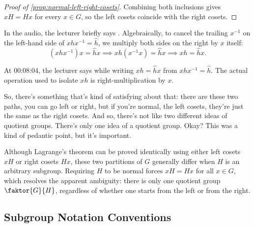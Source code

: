\begin{proofWrapper}
\begin{content}
\begin{proof}[Proof of \cref{prop:normal-left-right-cosets}]
Combining both inclusions gives $xH = Hx$ for every $x \in G$, so the left cosets coincide with the right cosets.
\end{proof}

\begin{steps}
In the audio, the lecturer briefly says . Algebraically, to cancel the trailing $x^{-1}$ on the left-hand side of $x h x^{-1} = \hat{h}$, we multiply both sides on the right by $x$ itself:
\[
(x h x^{-1}) x = \hat{h} x \implies x h (x^{-1} x) = \hat{h} x \implies x h = \hat{h} x.
\]
\end{steps}
\end{content}

\begin{aiNote}
At 00:08:04, the lecturer says  while writing $xh = \hat{h}x$ from $x h x^{-1} = \hat{h}$. The actual operation used to isolate $xh$ is right-multiplication by $x$.
\end{aiNote}

\end{proofWrapper}

\begin{speech}[00:08:20 - 00:08:45]
So, there's something that's kind of satisfying about that: there are these two paths, you can go left or right, but if you're normal, the left cosets, they're just the same as the right cosets. And so, there's not like two different ideas of quotient groups. There's only one idea of a quotient group. Okay? This was a kind of pedantic point, but it's important.
\end{speech}

\begin{insight}
Although Lagrange's theorem can be proved identically using either left cosets $xH$ or right cosets $Hx$, these two partitions of $G$ generally differ when $H$ is an arbitrary subgroup. Requiring $H$ to be normal forces $xH = Hx$ for all $x \in G$, which resolves the apparent ambiguity: there is only one quotient group $\faktor{G}{H}$, regardless of whether one starts from the left or from the right.
\end{insight}

\subsection{Subgroup Notation Conventions}

